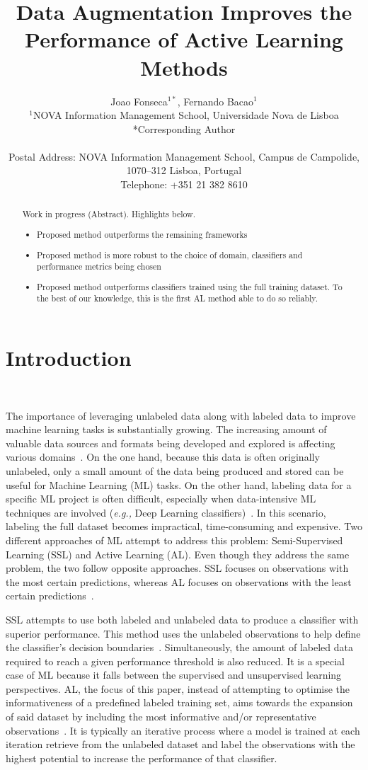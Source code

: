 \documentclass[parskip=full]{scrartcl}
\date{}
\title{%
    Data Augmentation Improves the Performance of Active Learning Methods
}
\author{%
	Joao Fonseca\(^{1*}\), Fernando Bacao\(^{1}\)
	\\
	\small{\(^{1}\)NOVA Information Management School, Universidade Nova de Lisboa}
	\\
	\small{*Corresponding Author}
	\\
	\\
	\small{Postal Address: NOVA Information Management School, Campus de
    Campolide, 1070--312 Lisboa, Portugal}
	\\
	\small{Telephone: +351 21 382 8610}
}
\begin{document}
\maketitle

\begin{abstract}
    Work in progress (Abstract). Highlights below.
    \begin{itemize}
        \item Proposed method outperforms the remaining frameworks
        \item Proposed method is more robust to the choice of domain, classifiers
            and performance metrics being chosen
        \item Proposed method outperforms classifiers trained using the full
            training dataset. To the best of our knowledge, this is the first
            AL method able to do so reliably.
    \end{itemize}
\end{abstract}

\section{Introduction}~\label{sec:introduction}

The importance of leveraging unlabeled data along with labeled data to improve
machine learning tasks is substantially growing. The increasing amount of
valuable data sources and formats being developed and explored is affecting
various domains~\cite{Li2021}. On the one hand, because this data is often
originally unlabeled, only a small amount of the data being produced and
stored can be useful for Machine Learning (ML) tasks. On the other hand,
labeling data for a specific ML project is often difficult, especially when
data-intensive ML techniques are involved (\textit{e.g.,} Deep Learning
classifiers)~\cite{Nath2021}. In this scenario, labeling the full dataset
becomes impractical, time-consuming and expensive. Two different approaches of
ML attempt to address this problem: Semi-Supervised Learning (SSL) and Active
Learning (AL). Even though they address the same problem, the two follow
opposite approaches. SSL focuses on observations with the most certain
predictions, whereas AL focuses on observations with the least certain
predictions~\cite{Simeoni2020}.

SSL attempts to use both labeled and unlabeled data to produce a classifier
with superior performance. This method uses the unlabeled observations to help
define the classifier's decision boundaries~\cite{Van2020}. Simultaneously,
the amount of labeled data required to reach a given performance threshold is
also reduced. It is a special case of ML because it falls between the
supervised and unsupervised learning perspectives. AL, the focus of this
paper, instead of attempting to optimise the informativeness of a predefined
labeled training set, aims towards the expansion of said dataset by including
the most informative and/or representative observations~\cite{Sener2018}. It
is typically an iterative process where a model is trained at each iteration
retrieve from the unlabeled dataset and label the observations with the
highest potential to increase the performance of that classifier.
\end{document}
